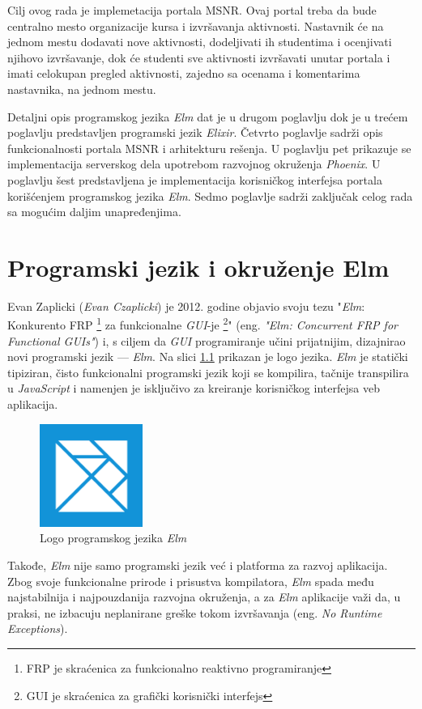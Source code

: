 \documentclass[12pt,oneside]{memoir}
\begin{document}
Cilj ovog rada je implemetacija portala MSNR.
Ovaj portal treba da bude centralno mesto organizacije kursa i izvršavanja aktivnosti.
Nastavnik će na jednom mestu dodavati nove aktivnosti, dodeljivati ih studentima i ocenjivati
njihovo izvršavanje, dok će studenti sve aktivnosti izvršavati unutar portala i imati celokupan
pregled aktivnosti, zajedno sa ocenama i komentarima nastavnika, na jednom mestu.

Detaljni opis programskog jezika \emph{Elm} dat je u drugom poglavlju dok je u trećem poglavlju predstavljen programski jezik \emph{Elixir}.
Četvrto poglavlje sadrži opis funkcionalnosti portala MSNR i arhitekturu rešenja.
U poglavlju pet prikazuje se implementacija serverskog dela upotrebom razvojnog
okruženja \emph{Phoenix}. U poglavlju šest predstavljena je implementacija korisničkog interfejsa
portala korišćenjem programskog jezika \emph{Elm}. Sedmo poglavlje sadrži zaključak celog rada sa
mogućim daljim unapređenjima.

\chapter{Programski jezik i okruženje Elm}
Evan Zaplicki (\emph{Evan Czaplicki}) je 2012. godine objavio svoju tezu "\emph{Elm}: Konkurento FRP
\footnote{FRP je skraćenica za funkcionalno reaktivno programiranje} za funkcionalne \emph{GUI}-je
\footnote{GUI je skraćenica za grafički korisnički interfejs}" (eng. \emph{"Elm: Concurrent
FRP for Functional GUIs"}) \cite{elm:2012} i, s ciljem da \emph{GUI} programiranje učini
prijatnijim, dizajnirao novi programski jezik --- \emph{Elm}. Na slici \ref{fig:elm-logo} prikazan
je logo jezika.
\emph{Elm} je statički tipiziran, čisto funkcionalni programski jezik koji se
kompilira, tačnije transpilira u \emph{JavaScript} i namenjen je isključivo za
kreiranje korisničkog interfejsa veb aplikacija.
\begin{figure}[!ht]
  \centering
  \includegraphics[width=0.3\textwidth]{elm.png}
  \caption{Logo programskog jezika \emph{Elm}}
  \label{fig:elm-logo}
\end{figure}
Takođe, \emph{Elm} nije samo programski jezik već i platforma za razvoj aplikacija.
Zbog svoje funkcionalne prirode i prisustva kompilatora, \emph{Elm} spada među
najstabilnija i najpouzdanija razvojna okruženja, a za \emph{Elm} aplikacije važi
da, u praksi, ne izbacuju neplanirane greške tokom izvršavanja (eng. \emph{No 
Runtime Exceptions}).
\end{document}
